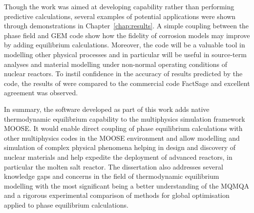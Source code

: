 	Though the work was aimed at developing capability rather than performing predictive calculations, several examples of potential applications were shown through demonstrations in Chapter~\ref{chap:results}. A simple coupling between the phase field and GEM code show how the fidelity of corrosion models may improve by adding equilibrium calculations. Moreover, the code will be a valuable tool in modelling other physical processes and in particular will be useful in source-term analyses and material modelling under non-normal operating conditions of nuclear reactors. To instil confidence in the accuracy of results predicted by the code, the results of {\GEM} were compared to the commercial code FactSage and excellent agreement was observed.
	
	In summary, the software developed as part of this work adds native thermodynamic equilibrium capability to the multiphysics simulation framework MOOSE. It would enable direct coupling of phase equilibrium calculations with other multiphysics codes in the MOOSE environment and allow modelling and simulation of complex physical phenomena helping in design and discovery of nuclear materials and help expedite the deployment of advanced reactors, in particular the molten salt reactor. The dissertation also addresses several knowledge gaps and concerns in the field of thermodynamic equilibrium modelling with the most significant being a better understanding of the MQMQA and a rigorous experimental comparison of methods for global optimisation applied to phase equilibrium calculations.
	
	
	